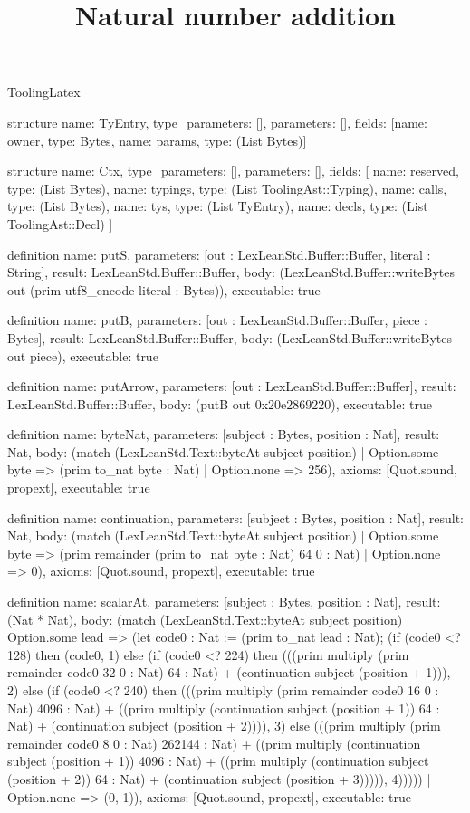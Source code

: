 \begin{lexlean}{ToolingLatex}
\title{Natural number addition}
\begin{semanticmodule}
structure{
  name: TyEntry,
  type_parameters: [],
  parameters: [],
  fields: [{name: owner, type: Bytes}, {name: params, type: (List Bytes)}]
}

structure{
  name: Ctx,
  type_parameters: [],
  parameters: [],
  fields: [
    {name: reserved, type: (List Bytes)},
    {name: typings, type: (List ToolingAst::Typing)},
    {name: calls, type: (List Bytes)},
    {name: tys, type: (List TyEntry)},
    {name: decls, type: (List ToolingAst::Decl)}
  ]
}

definition{
  name: putS,
  parameters: [out : LexLeanStd.Buffer::Buffer, literal : String],
  result: LexLeanStd.Buffer::Buffer,
  body: (LexLeanStd.Buffer::writeBytes out (prim utf8_encode literal : Bytes)),
  executable: true
}

definition{
  name: putB,
  parameters: [out : LexLeanStd.Buffer::Buffer, piece : Bytes],
  result: LexLeanStd.Buffer::Buffer,
  body: (LexLeanStd.Buffer::writeBytes out piece),
  executable: true
}

definition{
  name: putArrow,
  parameters: [out : LexLeanStd.Buffer::Buffer],
  result: LexLeanStd.Buffer::Buffer,
  body: (putB out 0x20e2869220),
  executable: true
}

definition{
  name: byteNat,
  parameters: [subject : Bytes, position : Nat],
  result: Nat,
  body: (match (LexLeanStd.Text::byteAt subject position)
    | Option.some byte => (prim to_nat byte : Nat)
    | Option.none => 256),
  axioms: [Quot.sound, propext],
  executable: true
}

definition{
  name: continuation,
  parameters: [subject : Bytes, position : Nat],
  result: Nat,
  body: (match (LexLeanStd.Text::byteAt subject position)
    | Option.some byte => (prim remainder (prim to_nat byte : Nat) 64 0 : Nat)
    | Option.none => 0),
  axioms: [Quot.sound, propext],
  executable: true
}

definition{
  name: scalarAt,
  parameters: [subject : Bytes, position : Nat],
  result: (Nat * Nat),
  body: (match (LexLeanStd.Text::byteAt subject position)
    | Option.some lead => (let code0 : Nat := (prim to_nat lead : Nat); (if (code0 <? 128) then (code0, 1) else (if (code0 <? 224) then (((prim multiply (prim remainder code0 32 0 : Nat) 64 : Nat) + (continuation subject (position + 1))), 2) else (if (code0 <? 240) then (((prim multiply (prim remainder code0 16 0 : Nat) 4096 : Nat) + ((prim multiply (continuation subject (position + 1)) 64 : Nat) + (continuation subject (position + 2)))), 3) else (((prim multiply (prim remainder code0 8 0 : Nat) 262144 : Nat) + ((prim multiply (continuation subject (position + 1)) 4096 : Nat) + ((prim multiply (continuation subject (position + 2)) 64 : Nat) + (continuation subject (position + 3))))), 4)))))
    | Option.none => (0, 1)),
  axioms: [Quot.sound, propext],
  executable: true
}


\end{semanticmodule}
\end{lexlean}
